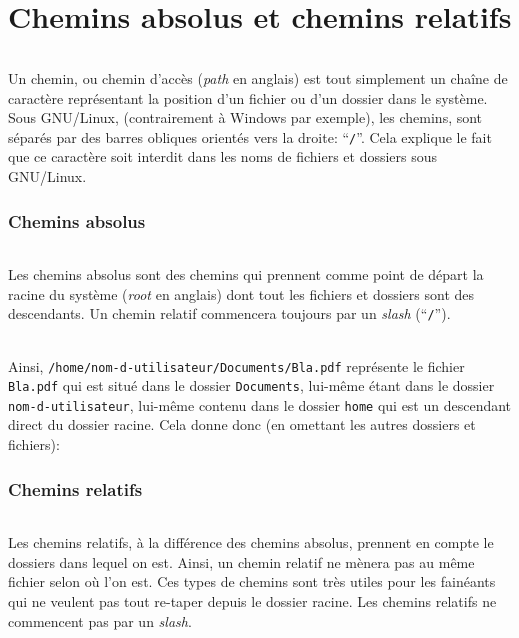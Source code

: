 \documentclass[french, a4paper, 12pt, titlepage]{article}
\begin{document}
\part{Chemins absolus et chemins relatifs}

\paragraph{} Un chemin, ou chemin d'accès (\emph{path} en anglais) est tout
simplement un chaîne de caractère représentant la position d'un fichier ou d'un
dossier dans le système. Sous GNU/Linux, (contrairement à Windows par
exemple), les chemins, sont séparés par des barres obliques orientés vers la
droite: ``\texttt{/}''. Cela explique le fait que ce caractère soit interdit dans
les noms de fichiers et dossiers sous GNU/Linux.

\section{Chemins absolus}

\paragraph{} Les chemins absolus sont des chemins qui prennent comme point de
départ la racine du système (\emph{root} en anglais) dont tout les fichiers et
dossiers sont des descendants. Un chemin relatif commencera toujours par un
\emph{slash} (``\texttt{/}'').

\paragraph{} Ainsi, \texttt{/home/nom-d-utilisateur/Documents/Bla.pdf}
représente le fichier \texttt{Bla.pdf} qui est situé dans le dossier
\texttt{Documents}, lui-même étant dans le dossier \texttt{nom-d-utilisateur},
lui-même contenu dans le dossier \texttt{home} qui est un descendant direct du
dossier racine. Cela donne donc (en omettant les autres dossiers et fichiers):
\\

\section{Chemins relatifs}

\paragraph{} Les chemins relatifs, à la différence des chemins absolus,
prennent en compte le dossiers dans lequel on est. Ainsi, un chemin relatif ne
mènera pas au même fichier selon où l'on est. Ces types de chemins sont très
utiles pour les fainéants qui ne veulent pas tout re-taper depuis le dossier
racine. Les chemins relatifs ne commencent pas par un \emph{slash}.
\end{document}
